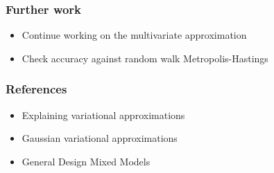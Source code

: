 \documentclass{beamer}
\begin{document}
\begin{frame}
\frametitle{Further work}
\begin{itemize}
\item Continue working on the multivariate approximation
\item Check accuracy against random walk Metropolis-Hastings
\end{itemize}
\end{frame}

\begin{frame}
\frametitle{References}
\begin{itemize}
\item Explaining variational approximations
\item Gaussian variational approximations
\item General Design Mixed Models
\end{itemize}
\end{frame}
\end{document}
